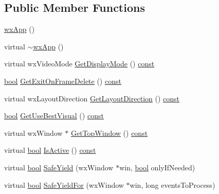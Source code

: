 \subsection*{Public Member Functions}
\begin{DoxyCompactItemize}
\item 
\hyperlink{classwx_app_a3a547cfe6155606bec0bc45e147d1ff9}{wx\+App} ()
\item 
virtual \hyperlink{classwx_app_a25231a49945f24810016957bfd47ee9c}{$\sim$wx\+App} ()
\item 
virtual wx\+Video\+Mode \hyperlink{classwx_app_a3eaf7422bab93bfd22e386dc9e818802}{Get\+Display\+Mode} () \hyperlink{getopt1_8c_a2c212835823e3c54a8ab6d95c652660e}{const} 
\item 
\hyperlink{mac_2config_2i386_2lib-src_2libsoxr_2soxr-config_8h_abb452686968e48b67397da5f97445f5b}{bool} \hyperlink{classwx_app_aee1f79af6e680ea4031299ace9615a67}{Get\+Exit\+On\+Frame\+Delete} () \hyperlink{getopt1_8c_a2c212835823e3c54a8ab6d95c652660e}{const} 
\item 
virtual wx\+Layout\+Direction \hyperlink{classwx_app_a8e1165d81e9cd2304a9417d31836b9a5}{Get\+Layout\+Direction} () \hyperlink{getopt1_8c_a2c212835823e3c54a8ab6d95c652660e}{const} 
\item 
\hyperlink{mac_2config_2i386_2lib-src_2libsoxr_2soxr-config_8h_abb452686968e48b67397da5f97445f5b}{bool} \hyperlink{classwx_app_a62c50aefd224ad3d0b1db1925c25995d}{Get\+Use\+Best\+Visual} () \hyperlink{getopt1_8c_a2c212835823e3c54a8ab6d95c652660e}{const} 
\item 
virtual wx\+Window $\ast$ \hyperlink{classwx_app_abc2b3305178f59f4024f492855c1bfdc}{Get\+Top\+Window} () \hyperlink{getopt1_8c_a2c212835823e3c54a8ab6d95c652660e}{const} 
\item 
virtual \hyperlink{mac_2config_2i386_2lib-src_2libsoxr_2soxr-config_8h_abb452686968e48b67397da5f97445f5b}{bool} \hyperlink{classwx_app_aa3e51f8e47abc31ee00b0cdfd29b9bdf}{Is\+Active} () \hyperlink{getopt1_8c_a2c212835823e3c54a8ab6d95c652660e}{const} 
\item 
virtual \hyperlink{mac_2config_2i386_2lib-src_2libsoxr_2soxr-config_8h_abb452686968e48b67397da5f97445f5b}{bool} \hyperlink{classwx_app_a81cc0e2724a7adbc0cc8b0aeeb5a072f}{Safe\+Yield} (wx\+Window $\ast$win, \hyperlink{mac_2config_2i386_2lib-src_2libsoxr_2soxr-config_8h_abb452686968e48b67397da5f97445f5b}{bool} only\+If\+Needed)
\item 
virtual \hyperlink{mac_2config_2i386_2lib-src_2libsoxr_2soxr-config_8h_abb452686968e48b67397da5f97445f5b}{bool} \hyperlink{classwx_app_a1537cb1bb2e4b556c4f0e8b3a740a6f8}{Safe\+Yield\+For} (wx\+Window $\ast$win, long events\+To\+Process)

\end{DoxyCompactItemize}
